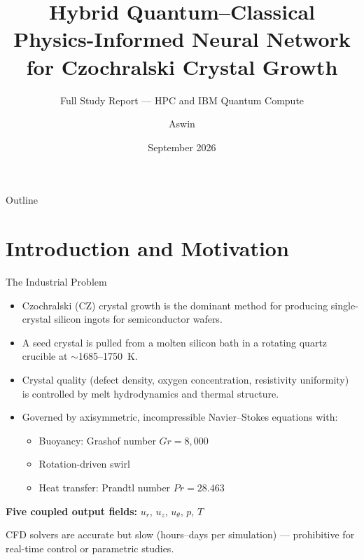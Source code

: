 \documentclass[aspectratio=169]{beamer}
\title{Hybrid Quantum--Classical Physics-Informed Neural Network \\ for Czochralski Crystal Growth}
\subtitle{Full Study Report --- HPC and IBM Quantum Compute}
\author{Aswin}
\date{September 2026}
\begin{document}
\begin{frame}
\titlepage
\end{frame}

\begin{frame}{Outline}
\tableofcontents
\end{frame}

\section{Introduction and Motivation}

\begin{frame}{The Industrial Problem}
\begin{itemize}
  \item Czochralski (CZ) crystal growth is the dominant method for producing single-crystal silicon ingots for semiconductor wafers.
  \item A seed crystal is pulled from a molten silicon bath in a rotating quartz crucible at $\sim$1685--1750~K.
  \item Crystal quality (defect density, oxygen concentration, resistivity uniformity) is controlled by melt hydrodynamics and thermal structure.
  \item Governed by axisymmetric, incompressible Navier--Stokes equations with:
  \begin{itemize}
    \item Buoyancy: Grashof number $Gr = 8{,}000$
    \item Rotation-driven swirl
    \item Heat transfer: Prandtl number $Pr = 28.463$
  \end{itemize}
\end{itemize}

\vspace{0.3cm}
\textbf{Five coupled output fields:} $u_r$, $u_z$, $u_\theta$, $p$, $T$

\vspace{0.3cm}
CFD solvers are accurate but slow (hours--days per simulation) --- prohibitive for real-time control or parametric studies.
\end{frame}
\end{document}
